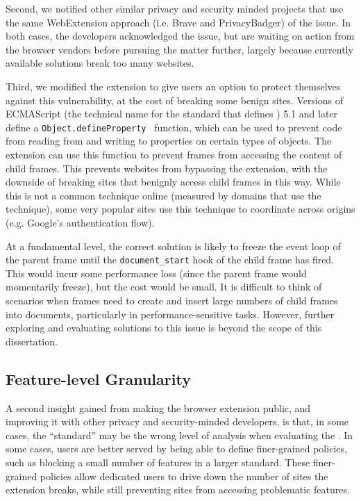 Second, we notified other similar privacy and security minded
projects that use the same WebExtension approach (i.e. Brave and PrivacyBadger)
of the issue.  In both cases, the developers acknowledged the issue, but are
waiting on action from the browser vendors before pursuing the matter further,
largely because currently available solutions break too many websites.

Third, we modified the extension to give users an option to protect themselves
against this vulnerability, at the cost of breaking some benign sites.  Versions
of ECMAScript (the technical name for the standard that defines \JS) 5.1
and later define a \texttt{Object.defineProperty}~\cite{ecmascript51} function,
which can be used to prevent code from reading from and writing to properties
on certain types of objects.  The extension can use this
function to prevent frames from accessing the content of child frames.
This prevents websites from bypassing the extension, with the downside of
breaking sites that benignly access child frames in this way.  While this
is not a common technique online (measured by domains that use the technique),
some very popular sites use this technique to coordinate across origins (e.g.
Google's authentication flow).

At a fundamental level, the correct solution is likely to freeze the event loop
of the parent frame until the \texttt{document\_start}
hook of the child frame has fired.  This would incur some performance
loss (since the parent frame would momentarily freeze), but the cost would
be small.  It is difficult to think of scenarios when frames need
to create and insert large numbers of child frames into documents, particularly
in performance-sensitive tasks.  However, further exploring and evaluating
solutions to this issue is beyond the scope of this dissertation.


\subsection{Feature-level Granularity}
\label{current-web:extension-deployment:feature-level}
A second insight gained from making the browser extension public, and improving
it with other privacy and security-minded developers, is that, in some cases,
the ``standard'' may be the wrong level of analysis when evaluating the
\WAPI.  In some cases, users are better served by being able to define
finer-grained policies, such as blocking a small number of features in a larger
standard.  These finer-grained policies allow dedicated users to drive down the
number of sites the extension breaks, while still preventing sites from
accessing problematic \WAPI features.

